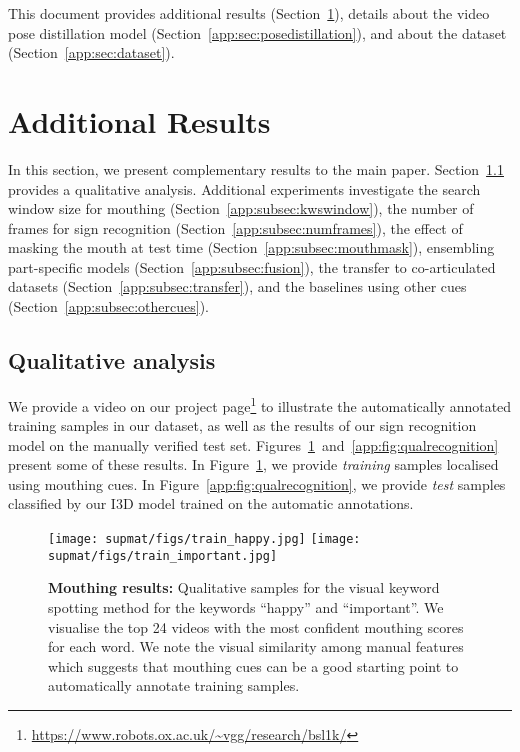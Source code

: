
\renewcommand{\thefigure}{A.\arabic{figure}}
\setcounter{figure}{0} 
\renewcommand{\thetable}{A.\arabic{table}}
\setcounter{table}{0} 

\appendix

This document provides additional results (Section~\ref{app:sec:additionalresults}),
details about the video pose distillation model (Section~\ref{app:sec:posedistillation}),
and about the \datasetName{} dataset (Section~\ref{app:sec:dataset}).

\section{Additional Results} \label{app:sec:additionalresults}
In this section, we present complementary results
to the main paper.
Section~\ref{app:subsec:qualitative} provides a qualitative analysis.
Additional experiments investigate
the search window size for mouthing (Section~\ref{app:subsec:kwswindow}),
the number of frames for sign recognition (Section~\ref{app:subsec:numframes}),
the effect of masking the mouth at test time (Section~\ref{app:subsec:mouthmask}),
ensembling part-specific models (Section~\ref{app:subsec:fusion}),
the transfer to co-articulated datasets (Section~\ref{app:subsec:transfer}),
and the baselines using other cues (Section~\ref{app:subsec:othercues}).

\subsection{Qualitative analysis} \label{app:subsec:qualitative}
We provide a video on our project page\footnote{ \url{https://www.robots.ox.ac.uk/~vgg/research/bsl1k/}}
to illustrate the automatically annotated training samples
in our \datasetName{} dataset, as well
as the results of our sign recognition
model on the manually verified test set.
Figures~\ref{app:fig:qualmouthing}~and~\ref{app:fig:qualrecognition}
present some of these results.
In Figure~\ref{app:fig:qualmouthing}, we provide
\textit{training} samples localised using mouthing cues.
In Figure~\ref{app:fig:qualrecognition}, we provide
\textit{test} samples classified by our I3D model trained
on the automatic annotations.

\begin{figure}
    \centering
\texttt{[image: supmat/figs/train\_happy.jpg]}
    \texttt{[image: supmat/figs/train\_important.jpg]}
    \caption{\textbf{Mouthing results:} Qualitative samples for the visual keyword spotting method for the keywords ``happy''
    and ``important''. We visualise the top 24 videos with the
    most confident mouthing scores for each word. We note the visual similarity
    among manual features which suggests that mouthing cues
    can be a good starting point to automatically annotate
    training samples.}
    \label{app:fig:qualmouthing}
\end{figure}

